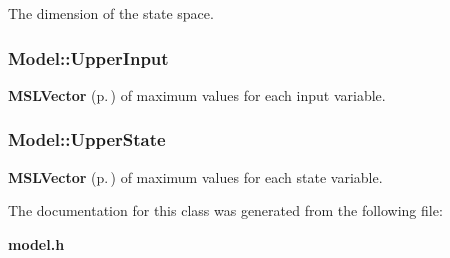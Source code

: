 The dimension of the state space.

\subsubsection{ Model::Upper\-Input}\label{class_Model_m4}


{\bf MSLVector} {\rm (p.\,\pageref{class_MSLVector})} of maximum values for each input variable.

\subsubsection{ Model::Upper\-State}\label{class_Model_m2}


{\bf MSLVector} {\rm (p.\,\pageref{class_MSLVector})} of maximum values for each state variable.



The documentation for this class was generated from the following file:\begin{CompactItemize}
\item 
{\bf model.h}\end{CompactItemize}
